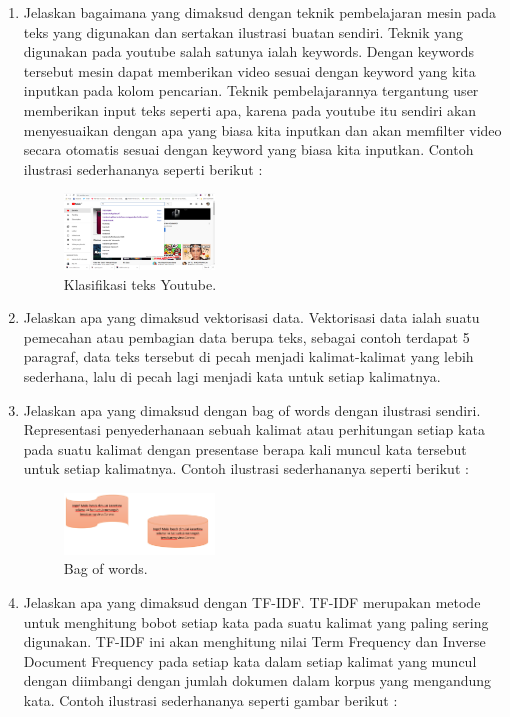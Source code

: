 \begin{enumerate}
	\item Jelaskan bagaimana yang dimaksud dengan teknik pembelajaran mesin pada teks yang digunakan dan sertakan ilustrasi buatan sendiri.
	\hfill\break
	Teknik yang digunakan pada youtube salah satunya ialah keywords. Dengan keywords tersebut mesin dapat memberikan video sesuai dengan keyword yang kita inputkan pada kolom pencarian. Teknik pembelajarannya tergantung user memberikan input teks seperti apa, karena pada youtube itu sendiri akan menyesuaikan dengan apa yang biasa kita inputkan dan akan memfilter video secara otomatis sesuai dengan keyword yang biasa kita inputkan. Contoh ilustrasi sederhananya seperti berikut :

	\begin{figure}[H]
	\centering
		\includegraphics[width=4cm]{figures/1174077/4/materi/3.PNG}
		\caption{Klasifikasi teks Youtube.}
	\end{figure}

	\item Jelaskan apa yang dimaksud vektorisasi data.
	\hfill\break
	Vektorisasi data ialah suatu pemecahan atau pembagian data berupa teks, sebagai contoh terdapat 5 paragraf, data teks tersebut di pecah menjadi kalimat-kalimat yang lebih sederhana, lalu di pecah lagi menjadi kata untuk setiap kalimatnya. 

	\item Jelaskan apa yang dimaksud dengan bag of words dengan ilustrasi sendiri.
	\hfill\break
	Representasi penyederhanaan sebuah kalimat atau perhitungan setiap kata pada suatu kalimat dengan presentase berapa kali muncul kata tersebut untuk setiap kalimatnya. Contoh ilustrasi sederhananya seperti berikut : 

	\begin{figure}[H]
	\centering
		\includegraphics[width=4cm]{figures/1174077/4/materi/4.PNG}
		\caption{Bag of words.}
	\end{figure}

	\item Jelaskan apa yang dimaksud dengan TF-IDF.
	\hfill\break
	TF-IDF merupakan metode untuk menghitung bobot setiap kata pada suatu kalimat yang paling sering digunakan. TF-IDF ini akan menghitung nilai Term Frequency dan Inverse Document Frequency pada setiap kata dalam setiap kalimat yang muncul dengan diimbangi dengan jumlah dokumen dalam korpus yang mengandung kata. Contoh ilustrasi sederhananya seperti gambar berikut : 
	\end{enumerate}
